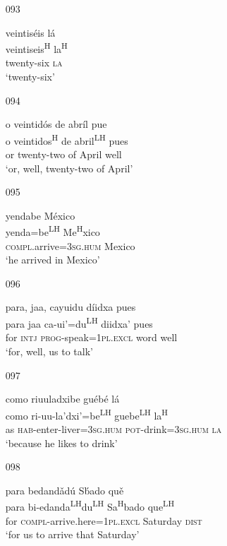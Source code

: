 \begin{itemize}
\item[093]
 
\glll   veintis\'{e}is l\'{a} \\
 veintiseis\textsuperscript{H} la\textsuperscript{H}\\
 twenty-six \textsc{la}\\
\glt `twenty-six'
 


\item[094]
 
\glll   o veintid\'{o}s de abr\'{i}l pue\\
o veintidos\textsuperscript{H} de abril\textsuperscript{LH} pues\\
 or twenty-two of April well\\
\glt `or, well, twenty-two of April'
 


\item[095]
 
\glll   yendabe M\'{e}xico \\
yenda=be\textsuperscript{LH} Me\textsuperscript{H}xico\\
\textsc{compl}.arrive=\textsc{3sg.hum} Mexico\\
\glt `he arrived in Mexico'
 

\item[096]
 
\glll   para, jaa, cayuidu d\'{i}idxa pues \\
para jaa ca-ui'=du\textsuperscript{LH} diidxa' pues \\
for \textsc{intj} \textsc{prog}-speak=\textsc{1pl.excl} word well\\
\glt `for, well, us to talk'
 

\item[097]
 
\glll   como riuuladxibe gu\'{e}b\'{e} l\'{a}\\
como ri-uu-la'dxi'=be\textsuperscript{LH} guebe\textsuperscript{LH} la\textsuperscript{H}\\
as \textsc{hab}-enter-liver=\textsc{3sg.hum} \textsc{pot}-drink=\textsc{3sg.hum} \textsc{la}\\
\glt `because he likes to drink'
 

\item[098]
 
\glll   para bedand\v{a}d\'{u} S\'{b}ado qu\v{e} \\
para bi-edanda\textsuperscript{LH}du\textsuperscript{LH} Sa\textsuperscript{H}bado que\textsuperscript{LH} \\
for \textsc{compl}-arrive.here=\textsc{1pl.excl} Saturday \textsc{dist}\\
\glt `for us to arrive that Saturday'
 



\end{itemize}

